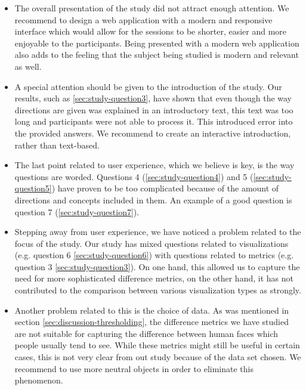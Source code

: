 \begin{itemize}
	\item The overall presentation of the study did not attract enough attention. We recommend to design a web application with a modern and responsive interface which would allow for the sessions to be shorter, easier and more enjoyable to the participants. Being presented with a modern web application also adds to the feeling that the subject being studied is modern and relevant as well.
	\item A special attention should be given to the introduction of the study. Our results, such as \ref{sec:study-question3}, have shown that even though the way directions are given was explained in an introductory text, this text was too long and participants were not able to process it. This introduced error into the provided answers. We recommend to create an interactive introduction, rather than text-based.
	\item The last point related to user experience, which we believe is key, is the way questions are worded. Questions 4 (\ref{sec:study-question4}) and 5 (\ref{sec:study-question5}) have proven to be too complicated because of the amount of directions and concepts included in them. An example of a good question is question 7 (\ref{sec:study-question7}).
	\item Stepping away from user experience, we have noticed a problem related to the focus of the study. Our study has mixed questions related to visualizations (e.g. question 6 \ref{sec:study-question6}) with questions related to metrics (e.g. question 3 \ref{sec:study-question3}). On one hand, this allowed us to capture the need for more sophisticated difference metrics, on the other hand, it has not contributed to the comparison between various visualization types as strongly.
	\item Another problem related to this is the choice of data. As was mentioned in section \ref{sec:discussion-thresholding}, the difference metrics we have studied are not suitable for capturing the difference between human faces which people usually tend to see. While these metrics might still be useful in certain cases, this is not very clear from out study because of the data set chosen. We recommend to use more neutral objects in order to eliminate this phenomenon.
\end{itemize}

